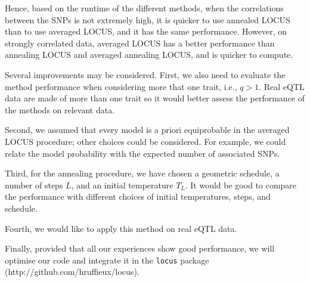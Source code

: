 \documentclass[a4paper, 11pt]{report}
\numberwithin{equation}{chapter}
\begin{document}
Hence, based on the runtime of the different methods, when the correlations between the SNPs is not extremely high, it is quicker to use annealed LOCUS than to use averaged LOCUS, and it has the same performance. However, on strongly correlated data, averaged LOCUS has a better performance than annealing LOCUS and averaged annealing LOCUS, and is quicker to compute.


Several improvements may be considered. First, we also need to evaluate the method performance when considering more that one trait, i.e., $q > 1$. Real eQTL data are made of more than one trait so it would better assess the performance of the methods on relevant data.

Second, we assumed that every model is a priori equiprobable in the averaged LOCUS procedure; other choices could be considered. For example, we could relate the model probability with the expected number of associated SNPs.

Third, for the annealing procedure, we have chosen a geometric schedule, a number of steps $L$, and an initial temperature $T_L$. It would be good to compare the performance with different choices of initial temperatures, steps, and schedule.


Fourth, we would like to apply this method on real eQTL data.

Finally, provided that all our experiences show good performance, we will optimise our code and integrate it in the \texttt{locus} package\\
 (http://github.com/hruffieux/locus).
\newpage


\end{document}

